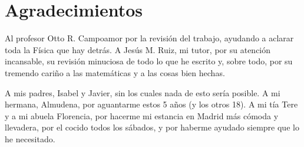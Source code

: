 \documentclass[11pt,a4paper,twoside]{book}
\begin{document}
\chapter*{Agradecimientos}

Al profesor Otto R. Campoamor por la revisión del trabajo, ayudando a aclarar toda la Física que hay detrás. 
A Jesús M. Ruiz, mi tutor, por su atención incansable, su revisión minuciosa de todo lo que he escrito y, sobre todo, por su tremendo cariño a las matemáticas y a las cosas bien hechas.

A mis padres, Isabel y Javier, sin los cuales nada de esto sería posible.
A mi hermana, Almudena, por aguantarme estos 5 años (y los otros 18).
A mi tía Tere y a mi abuela Florencia, por hacerme mi estancia en Madrid más cómoda y llevadera, por el cocido todos los sábados, y por haberme ayudado siempre que lo he necesitado. 
\end{document}
